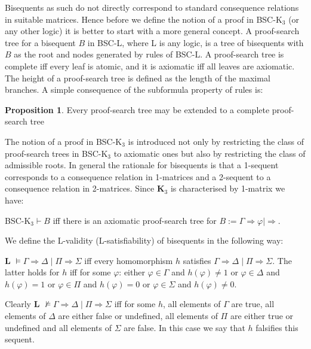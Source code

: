 \documentclass[11pt,a4paper,titlepage]{article}
\theoremstyle{definition}
\newtheorem{proposition}{ \textbf{Proposition}}
\newcommand{\3}{\vspace{.3in}}
\newcommand{\2}{\vspace{.2in}}
\newcommand{\1}{\vspace{.1in}}
\newcommand{\5}{\vspace{.05in}}
\begin{document}
Bisequents as such do not directly correspond to standard consequence relations in suitable matrices. Hence 
before we define the notion of a proof in BSC-K$_3$ (or any other logic) it is better to start with a more general concept. A proof-search tree for a bisequent $B$ in BSC-L, where L is any logic, is a tree of bisequents with $B$ as the root and nodes generated by rules of BSC-L. A proof-search tree is complete iff every leaf is atomic, and it is axiomatic iff all leaves are axiomatic. The height of a proof-search tree is defined as the length of the maximal branches. A simple consequence of the subformula property of rules is:


\begin{proposition}
	Every proof-search tree may be extended to a complete proof-search tree
\end{proposition}


The notion of a proof in BSC-K$_3$ is introduced not only by restricting the class of proof-search trees in BSC-K$_3$ to axiomatic ones but also  by restricting the class of admissible roots. In general the rationale for bisequents is that a 1-sequent corresponds to a consequence relation in 1-matrices and a 2-sequent to a consequence relation in 2-matrices. Since {\bf K$_3$} is characterised by 1-matrix we have:

\1

BSC-K$_3  \vdash B$ iff there is an axiomatic proof-search tree for $B := \Gamma\Rightarrow\varphi \mid \Rightarrow$.

\1

We define the L-validity (L-satisfiability) of bisequents in the following way:

\1

{\bf L} $\models\Gamma\Rightarrow\Delta \mid \Pi\Rightarrow\Sigma$ iff 
every homomorphism $h$ satisfies $\Gamma\Rightarrow\Delta \mid \Pi\Rightarrow\Sigma$. The latter holds for $h$ iff for some $\varphi$: either $\varphi\in \Gamma$ and $h(\varphi)\neq 1$ or $\varphi\in \Delta$ and $h(\varphi)=1$ or $\varphi\in \Pi$ and $h(\varphi)=0$ or $\varphi\in \Sigma$ and $h(\varphi)\neq 0$.

\1

Clearly {\bf L} $\not \models\Gamma\Rightarrow\Delta \mid \Pi\Rightarrow\Sigma$ iff for some $h$, all elements of $\Gamma$ are true, all elements of $\Delta$ are either false or undefined, all elements of $\Pi$ are either true or undefined and all elements of $\Sigma$ are false. In this case we say that $h$ falsifies this sequent.
\end{document}
